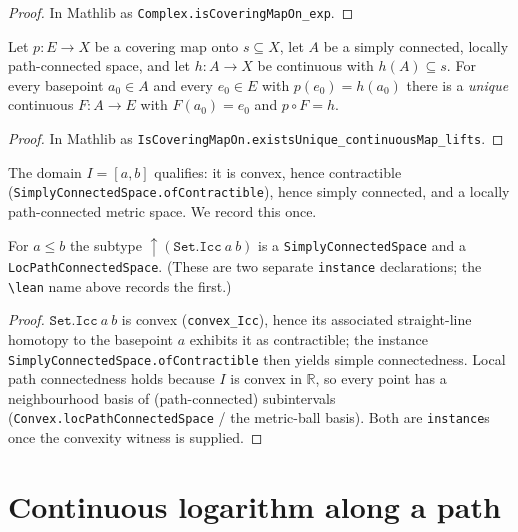\begin{proof}
\leanok
In Mathlib as \texttt{Complex.isCoveringMapOn\_exp}.
\end{proof}

\begin{theorem}
\label{thm:av_lift}
\leanok
{}
Let $p:E\to X$ be a covering map onto $s\subseteq X$, let $A$ be a simply
connected, locally path-connected space, and let $h:A\to X$ be continuous with
$h(A)\subseteq s$. For every basepoint $a_0\in A$ and every $e_0\in E$ with
$p(e_0)=h(a_0)$ there is a \emph{unique} continuous $F:A\to E$ with $F(a_0)=e_0$
and $p\circ F = h$.
\end{theorem}

\begin{proof}
\leanok
In Mathlib as \texttt{IsCoveringMapOn.existsUnique\_continuousMap\_lifts}.
\end{proof}

The domain $I=[a,b]$ qualifies: it is convex, hence contractible
(\texttt{SimplyConnectedSpace.ofContractible}), hence simply connected, and a
locally path-connected metric space. We record this once.

\begin{lemma}
\label{lem:av_domain}
\leanok
{}
For $a\le b$ the subtype $\uparrow(\texttt{Set.Icc}\ a\ b)$ is a
\texttt{SimplyConnectedSpace} and a \texttt{LocPathConnectedSpace}. (These are two
separate \texttt{instance} declarations; the \texttt{\textbackslash lean} name above
records the first.)
\end{lemma}

\begin{proof}
\leanok
$\texttt{Set.Icc}\ a\ b$ is convex (\texttt{convex\_Icc}), hence its associated
straight-line homotopy to the basepoint $a$ exhibits it as contractible; the
instance \texttt{SimplyConnectedSpace.ofContractible} then yields simple
connectedness. Local path connectedness holds because $I$ is convex in $\mathbb R$,
so every point has a neighbourhood basis of (path-connected) subintervals
(\texttt{Convex.locPathConnectedSpace} / the metric-ball basis). Both are
\texttt{instance}s once the convexity witness is supplied.
\end{proof}

\section{Continuous logarithm along a path}
\label{sec:av_contlog}

